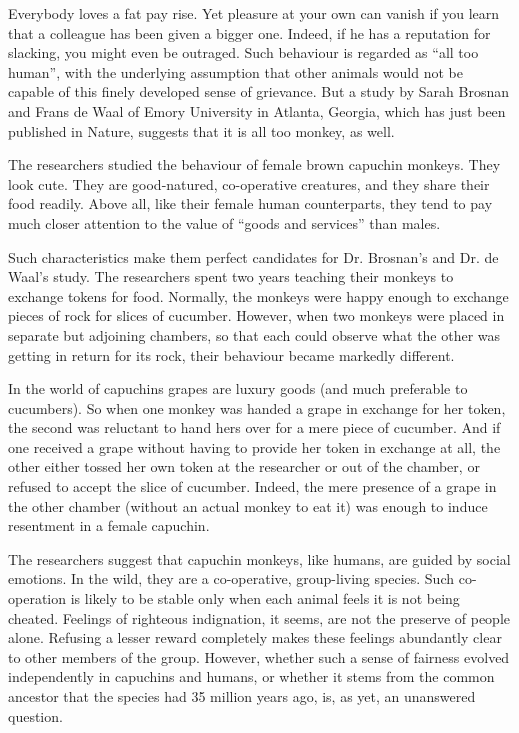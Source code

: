 Everybody loves a fat pay rise. Yet pleasure at your own can vanish if you learn that a colleague has been given a bigger one. Indeed, if he has a reputation for slacking, you might even be outraged. Such behaviour is regarded as ``all too human'', with the underlying assumption that other animals would not be capable of this finely developed sense of grievance. But a study by Sarah Brosnan and Frans de Waal of Emory University in Atlanta, Georgia, which has just been published in Nature, suggests that it is all too monkey, as well.


The researchers studied the behaviour of female brown capuchin monkeys. They look cute. They are good-natured, co-operative creatures, and they share their food readily. Above all, like their female human counterparts, they tend to pay much closer attention to the value of ``goods and services'' than males.


Such characteristics make them perfect candidates for Dr. Brosnan's and Dr. de Waal's study. The researchers spent two years teaching their monkeys to exchange tokens for food. Normally, the monkeys were happy enough to exchange pieces of rock for slices of cucumber. However, when two monkeys were placed in separate but adjoining chambers, so that each could observe what the other was getting in return for its rock, their behaviour became markedly different.


In the world of capuchins grapes are luxury goods (and much preferable to cucumbers). So when one monkey was handed a grape in exchange for her token, the second was reluctant to hand hers over for a mere piece of cucumber. And if one received a grape without having to provide her token in exchange at all, the other either tossed her own token at the researcher or out of the chamber, or refused to accept the slice of cucumber. Indeed, the mere presence of a grape in the other chamber (without an actual monkey to eat it) was enough to induce resentment in a female capuchin.


The researchers suggest that capuchin monkeys, like humans, are guided by social emotions. In the wild, they are a co-operative, group-living species. Such co-operation is likely to be stable only when each animal feels it is not being cheated. Feelings of righteous indignation, it seems, are not the preserve of people alone. Refusing a lesser reward completely makes these feelings abundantly clear to other members of the group. However, whether such a sense of fairness evolved independently in capuchins and humans, or whether it stems from the common ancestor that the species had 35 million years ago, is, as yet, an unanswered question.